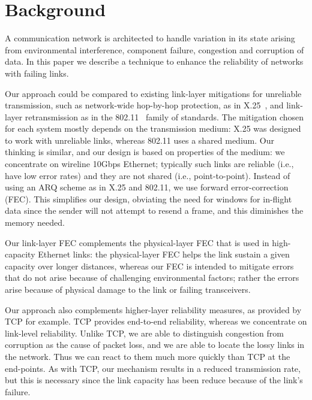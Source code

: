 \section{Background}
A communication network is architected to handle variation in its state
arising from environmental interference, component failure, congestion and
corruption of data. In this paper we describe a technique to enhance the
reliability of networks with failing links.

Our approach could be compared to existing link-layer mitigations for
unreliable transmission, such as network-wide hop-by-hop protection, as in
X.25~\cite{X25}, and link-layer retransmission as in the 802.11~\cite{WiFi} family of
standards. The mitigation chosen for each system mostly depends on
the transmission medium: X.25 was designed to work with unreliable links,
whereas 802.11 uses a shared medium. Our thinking is similar,
and our design is based on properties of the medium: we concentrate on wireline
10Gbps Ethernet; typically such links are reliable (i.e., have low error
rates) and they are not shared (i.e., point-to-point).
Instead of using an ARQ scheme as in X.25 and 802.11, we use forward
error-correction (FEC). This simplifies our design, obviating the need
for windows for in-flight data since the sender will not attempt to
resend a frame, and this diminishes the memory needed.

Our link-layer FEC complements the physical-layer FEC that is used in
high-capacity Ethernet links: the physical-layer FEC helps the link sustain a
given capacity over longer distances, whereas our FEC is intended to mitigate
errors that do not arise because of challenging environmental factors; rather
the errors arise because of physical damage to the link or failing transceivers.

Our approach also complements higher-layer reliability measures, as provided by
TCP for example.  TCP provides end-to-end reliability, whereas we concentrate
on link-level reliability. Unlike TCP, we are able to distinguish congestion
from corruption as the cause of packet loss, and we are able to locate the
lossy links in the network. Thus we can react to them much more quickly than
TCP at the end-points. As with TCP, our mechanism results in a reduced
transmission rate, but this is necessary since the link capacity has been
reduce because of the link's failure.

